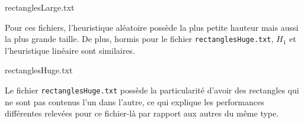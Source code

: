 \begin{table}
\caption{rectanglesLarge.txt}\label{tab:rect1}

\end{table}

Pour ces fichiers, l'heuristique aléatoire possède
la plus petite hauteur mais aussi la plus grande taille.
De plus, hormis pour le fichier \texttt{rectanglesHuge.txt}, $H_1$
et l'heuristique linéaire sont similaires.

\begin{table}
\caption{rectanglesHuge.txt}\label{tab:rect2}

\end{table}

Le fichier \texttt{rectanglesHuge.txt} possède la particularité d'avoir des
rectangles qui ne sont pas contenus l'un dans l'autre, ce qui explique
les performances différentes relevées pour ce fichier-là par rapport aux
autres du même type.

